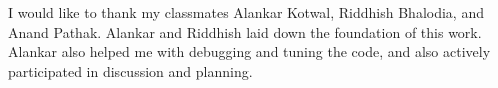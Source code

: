 \acknowledgments

I would like to thank my classmates Alankar Kotwal, Riddhish Bhalodia, and Anand Pathak. Alankar and Riddhish laid down the foundation of this work. Alankar also helped me with debugging and tuning the code, and also actively participated in discussion and planning.






\signature{\today}


